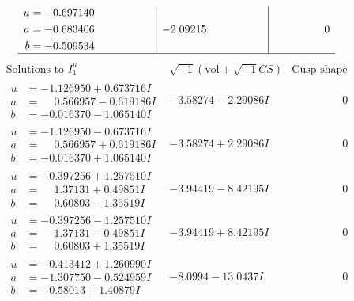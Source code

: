 \documentclass[1p]{elsarticle_modified}
\theoremstyle{definition}
\newcommand{\I}{\sqrt{-1}}
\begin{document}
$$\begin{array}{c|c|c}
\begin{aligned}
u &= -0.697140\phantom{ +0.000000I} \\
a &= -0.683406\phantom{ +0.000000I} \\
b &= -0.509534\phantom{ +0.000000I}\end{aligned}
 & -2.09215\phantom{ +0.000000I} & \phantom{-0.000000 } 0\\
 \hline 
 \end{array}$$\newpage$$\begin{array}{c|c|c}  
\text{Solutions to }I^u_{1}& \I (\text{vol} + \sqrt{-1}CS) & \text{Cusp shape}\\
 \hline 
\begin{aligned}
u &= -1.126950 + 0.673716 I \\
a &= \phantom{-}0.566957 - 0.619186 I \\
b &= -0.016370 - 1.065140 I\end{aligned}
 & -3.58274 - 2.29086 I & \phantom{-0.000000 } 0 \\ \hline\begin{aligned}
u &= -1.126950 - 0.673716 I \\
a &= \phantom{-}0.566957 + 0.619186 I \\
b &= -0.016370 + 1.065140 I\end{aligned}
 & -3.58274 + 2.29086 I & \phantom{-0.000000 } 0 \\ \hline\begin{aligned}
u &= -0.397256 + 1.257510 I \\
a &= \phantom{-}1.37131 + 0.49851 I \\
b &= \phantom{-}0.60803 - 1.35519 I\end{aligned}
 & -3.94419 - 8.42195 I & \phantom{-0.000000 } 0 \\ \hline\begin{aligned}
u &= -0.397256 - 1.257510 I \\
a &= \phantom{-}1.37131 - 0.49851 I \\
b &= \phantom{-}0.60803 + 1.35519 I\end{aligned}
 & -3.94419 + 8.42195 I & \phantom{-0.000000 } 0 \\ \hline\begin{aligned}
u &= -0.413412 + 1.260990 I \\
a &= -1.307750 - 0.524959 I \\
b &= -0.58013 + 1.40879 I\end{aligned}
 & -8.0994 - 13.0437 I & \phantom{-0.000000 } 0 \\ \hline\begin{aligned}

\end{aligned}
\end{array}$$
\end{document}
